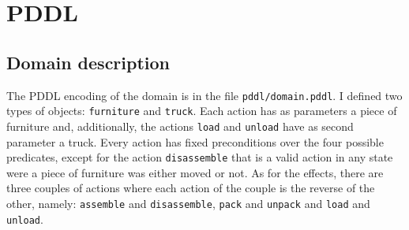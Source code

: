 \documentclass[12pt]{article}
\begin{document}
    \section{PDDL}\label{sec:pddl}

    \subsection{Domain description}\label{subsec:pddl-domain}
    The PDDL encoding of the domain is in the file \texttt{pddl/domain.pddl}.
    I defined two types of objects: \texttt{furniture} and \texttt{truck}.
    Each action has as parameters a piece of furniture and, additionally, the actions \texttt{load} and \texttt{unload} have as second parameter a truck.
    Every action has fixed preconditions over the four possible predicates, except for the action \texttt{disassemble} that is a valid action in any state were a piece of furniture was either moved or not.
    As for the effects, there are three couples of actions where each action of the couple is the reverse of the other, namely: \texttt{assemble} and \texttt{disassemble}, \texttt{pack} and \texttt{unpack} and \texttt{load} and \texttt{unload}.
\end{document}
